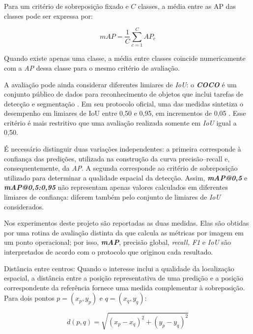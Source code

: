 Para um crit\'erio de sobreposi\c{c}\~ao fixado e $C$ classes, a m\'edia entre as AP das classes pode ser expressa por:

\begin{equation}
  mAP = \frac{1}{C}\sum_{c=1}^{C} AP_c
  \label{eq:map}
\end{equation}

Quando existe apenas uma classe, a m\'edia entre classes coincide numericamente com a \textit{AP} dessa classe para o mesmo crit\'erio de avalia\c{c}\~ao.

A avalia\c{c}\~ao pode ainda considerar diferentes limiares de \textit{IoU}: o \textbf{\textit{COCO}} \'e um conjunto p\'ublico de dados para reconhecimento de objetos que inclui tarefas de detec\c{c}\~ao e segmenta\c{c}\~ao \citep{lin2014}. Em seu protocolo oficial, uma das medidas sintetiza o desempenho em limiares de IoU entre 0,50 e 0,95, em incrementos de 0,05 \citep{cocoapi}. Esse crit\'erio \'e mais restritivo que uma avalia\c{c}\~ao realizada somente em \textit{IoU} igual a 0,50.

\'E necess\'ario distinguir duas varia\c{c}\~oes independentes: a primeira corresponde \`a confian\c{c}a das predi\c{c}\~oes, utilizada na constru\c{c}\~ao da curva precis\~ao--recall e, consequentemente, da \textit{AP}. A segunda corresponde ao crit\'erio de sobreposi\c{c}\~ao utilizado para determinar a qualidade espacial da detec\c{c}\~ao. Assim, \textbf{\textit{mAP@0,5}} e \textbf{\textit{mAP@0,5:0,95}} n\~ao representam apenas valores calculados em diferentes limiares de confian\c{c}a: diferem tamb\'em pelo conjunto de limiares de \textit{IoU} considerados.

Nos experimentos deste projeto s\~ao reportadas as duas medidas. Elas s\~ao obtidas por uma rotina de avalia\c{c}\~ao distinta da que calcula as m\'etricas por imagem em um ponto operacional; por isso, \textbf{\textit{mAP}}, precis\~ao global, \textit{recall, F1} e \textit{IoU} s\~ao interpretados de acordo com o protocolo que originou cada resultado.

Dist\^ancia entre centros: Quando o interesse inclui a qualidade da localiza\c{c}\~ao espacial, a dist\^ancia entre a posi\c{c}\~ao representativa de uma predi\c{c}\~ao e a posi\c{c}\~ao correspondente da refer\^encia fornece uma medida complementar \`a sobreposi\c{c}\~ao. Para dois pontos $p = (x_p, y_p)$ e $q = (x_q, y_q)$:

\begin{equation}
  d(p,q) = \sqrt{(x_p - x_q)^2 + (y_p - y_q)^2}
  \label{eq:distancia-centros-metrica}
\end{equation}

